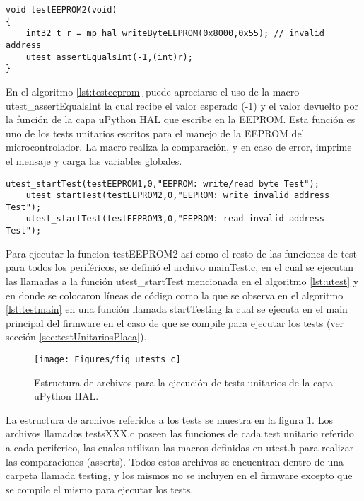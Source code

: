 \begin{lstlisting}[label={lst:testeeprom},caption=Ejemplo de un test unitario para la EEPROM usando una dirección inválida.]
void testEEPROM2(void)
{
	int32_t r = mp_hal_writeByteEEPROM(0x8000,0x55); // invalid address
	utest_assertEqualsInt(-1,(int)r);
}
\end{lstlisting}

En el algoritmo \ref{lst:testeeprom} puede apreciarse el uso de la macro utest\_assertEqualsInt la cual recibe el valor esperado (-1) y el valor devuelto por la función de la capa uPython HAL que escribe en la EEPROM. Esta función es uno de los tests unitarios escritos para el manejo de la EEPROM del microcontrolador. La macro realiza la comparación, y en caso de error, imprime el mensaje y carga las variables globales.

\begin{lstlisting}[label={lst:testmain},caption=Ejemplo de ejecución de funciones de test en archivo mainTest.c.]
	utest_startTest(testEEPROM1,0,"EEPROM: write/read byte Test");
	utest_startTest(testEEPROM2,0,"EEPROM: write invalid address Test");
	utest_startTest(testEEPROM3,0,"EEPROM: read invalid address Test");
\end{lstlisting}

Para ejecutar la funcion testEEPROM2 así como el resto de las funciones de test para todos los periféricos, se definió el archivo mainTest.c, en el cual se ejecutan las llamadas a la función utest\_startTest mencionada en el algoritmo \ref{lst:utest} y en donde se colocaron líneas de código como la que se observa en el algoritmo \ref{lst:testmain} en una función llamada startTesting la cual se ejecuta en el main principal del firmware en el caso de que se compile para ejecutar los tests (ver sección \ref{sec:testUnitariosPlaca}).

\begin{figure}[ht]
  \centering
    \texttt{[image: Figures/fig\_utests\_c]}
  \caption{Estructura de archivos para la ejecución de tests unitarios de la capa uPython HAL.}
  \label{fig:utestcarq}
\end{figure}

La estructura de archivos referidos a los tests se muestra en la figura \ref{fig:utestcarq}. Los archivos llamados testsXXX.c poseen las funciones de cada test unitario referido a cada periferico, las cuales utilizan las macros definidas en utest.h para realizar las comparaciones (asserts). Todos estos archivos se encuentran dentro de una carpeta llamada testing, y los mismos no se incluyen en el firmware excepto que se compile el mismo para ejecutar los tests.


